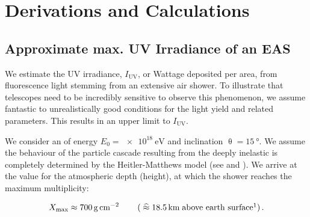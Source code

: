 
\chapter{Derivations and Calculations}
\label{app:derivation}


\section{Approximate max. UV Irradiance of an EAS}
\label{app:cr-uv-irradiance}

We estimate the UV irradiance, $I_\text{UV}$, or Wattage deposited per area, 
from fluorescence light stemming from an extensive air shower. To illustrate 
that telescopes need to be incredibly sensitive to observe this phenomenon, we 
assume fantastic to unrealistically good conditions for the \UV light yield and 
related parameters. This results in an  upper limit to $I_\text{UV}$.

We consider an \EAS of energy $E_0 = \SI{e18}{\eV}$ and inclination 
$\uptheta=\SI{15}{\degree}$. We assume the behaviour of the particle cascade 
resulting from the deeply inelastic is completely determined by the 
Heitler-Matthews model (see  and 
\cite{matthewsHeitlerModelExtensive2005, rissePhotonAirShowers2006}). We arrive
at the value for the atmospheric depth (height), at which the shower reaches the
maximum multiplicity:

\begin{equation}
\label{eq:irradiance-multiplicity}
\Xmax \approx \SI{700}{\gram\per\centi\meter\squared}\qquad\left(\;\widehat{\approx}\;\SI{18.5}{\kilo\meter}\;\text{above earth surface}\footnotemark\right).
\end{equation}

